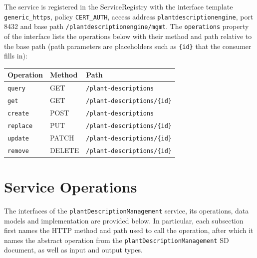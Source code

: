 \documentclass[a4paper]{arrowhead}
\begin{document}
The service is registered in the ServiceRegistry with the interface template \texttt{generic\_\allowbreak{}https}, policy \texttt{CERT\_\allowbreak{}AUTH}, access address \texttt{plantdescriptionengine}, port 8432 and base path \texttt{/\allowbreak{}plantdescriptionengine/\allowbreak{}mgmt}. The \texttt{operations} property of the interface lists the operations below with their method and path relative to the base path (path parameters are placeholders such as \texttt{\{id\}} that the consumer fills in):

\noindent\begin{longtable}{| p{5.2cm} | p{1.6cm} | p{8.4cm} |} \hline
\rowcolor{gray!33} Operation & Method & Path \\ \hline \endhead
\texttt{query} & GET & \texttt{/\allowbreak{}plant-\allowbreak{}descriptions} \\ \hline
\texttt{get} & GET & \texttt{/\allowbreak{}plant-\allowbreak{}descriptions/\allowbreak{}\{id\}} \\ \hline
\texttt{create} & POST & \texttt{/\allowbreak{}plant-\allowbreak{}descriptions} \\ \hline
\texttt{replace} & PUT & \texttt{/\allowbreak{}plant-\allowbreak{}descriptions/\allowbreak{}\{id\}} \\ \hline
\texttt{update} & PATCH & \texttt{/\allowbreak{}plant-\allowbreak{}descriptions/\allowbreak{}\{id\}} \\ \hline
\texttt{remove} & DELETE & \texttt{/\allowbreak{}plant-\allowbreak{}descriptions/\allowbreak{}\{id\}} \\ \hline
\end{longtable}

\newpage

\section{Service Operations}
\label{sec:operations}

The interfaces of the \texttt{plant\allowbreak{}Description\allowbreak{}Management} service, its operations, data models and implementation are provided below.
In particular, each subsection first names the HTTP method and path used to call the operation, after which it names the abstract operation from the \texttt{plant\allowbreak{}Description\allowbreak{}Management} SD document, as well as input and output types.
\end{document}
